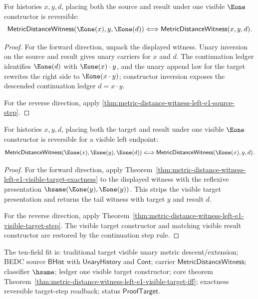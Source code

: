 \begin{theorem}
\label{thm:metric-distance-witness-left-e1-source-result-iff}
For histories $x,y,d$, placing both the source and result under one visible
$\Eone$ constructor is reversible:
$$
\mathsf{MetricDistanceWitness}(\Eone(x),y,\Eone(d))
\Longleftrightarrow
\mathsf{MetricDistanceWitness}(x,y,d).
$$
\end{theorem}
\begin{proof}
For the forward direction, unpack the displayed witness. Unary inversion on
the source and result gives unary carriers for $x$ and $d$. The continuation
ledger identifies $\Eone(d)$ with $\Eone(x)\cdot y$, and the unary append law
for the target rewrites the right side to $\Eone(x\cdot y)$; constructor
inversion exposes the descended continuation ledger $d=x\cdot y$.

For the reverse direction, apply
\autoref{thm:metric-distance-witness-left-e1-source-step}.
\end{proof}

\begin{theorem}
\label{thm:metric-distance-witness-left-e1-visible-target-iff}
For histories $x,y,d$, placing both the target and result under one visible
$\Eone$ constructor is reversible for a visible left endpoint:
$$
\mathsf{MetricDistanceWitness}(\Eone(x),\Eone(y),\Eone(d))
\Longleftrightarrow
\mathsf{MetricDistanceWitness}(\Eone(x),y,d).
$$
\end{theorem}
\begin{proof}
For the forward direction, apply
Theorem~\ref{thm:metric-distance-witness-left-e1-visible-target-exactness} to
the displayed witness with the reflexive presentation
$\hsame(\Eone(y),\Eone(y))$. This strips the visible target presentation and
returns the tail witness with target $y$ and result $d$.

For the reverse direction, apply
Theorem~\ref{thm:metric-distance-witness-left-e1-visible-target-step}. The
visible target constructor and matching visible result constructor are restored
by the continuation step rule.
\end{proof}

The ten-field fit is: traditional target visible unary metric
descent/extension; BEDC source $\mathsf{BHist}$ with $\mathsf{UnaryHistory}$
and $\mathsf{Cont}$; carrier $\mathsf{MetricDistanceWitness}$; classifier
$\hsame$; ledger one visible target constructor; core theorem
Theorem~\ref{thm:metric-distance-witness-left-e1-visible-target-iff};
exactness reversible target-step readback; status $\mathsf{ProofTarget}$.
